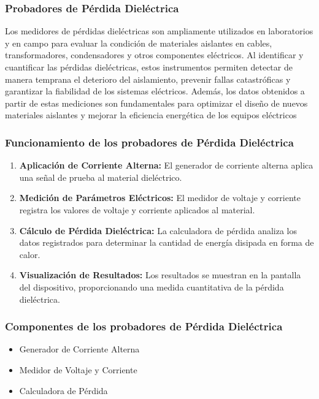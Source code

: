         \subsubsection{Probadores de Pérdida Dieléctrica}

            Los medidores de pérdidas dieléctricas son ampliamente utilizados en laboratorios y en campo para evaluar la condición de materiales aislantes en cables, transformadores, condensadores y otros componentes eléctricos. Al identificar y cuantificar las pérdidas dieléctricas, estos instrumentos permiten detectar de manera temprana el deterioro del aislamiento, prevenir fallas catastróficas y garantizar la fiabilidad de los sistemas eléctricos. Además, los datos obtenidos a partir de estas mediciones son fundamentales para optimizar el diseño de nuevos materiales aislantes y mejorar la eficiencia energética de los equipos eléctricos

        \subsubsection*{Funcionamiento de los probadores de Pérdida Dieléctrica}

            \begin{enumerate}
                \item \textbf{Aplicación de Corriente Alterna:} El generador de corriente alterna aplica una señal de prueba al material dieléctrico.
                \item \textbf{Medición de Parámetros Eléctricos:} El medidor de voltaje y corriente registra los valores de voltaje y corriente aplicados al material.
                \item \textbf{Cálculo de Pérdida Dieléctrica:} La calculadora de pérdida analiza los datos registrados para determinar la cantidad de energía disipada en forma de calor.
                \item \textbf{Visualización de Resultados:} Los resultados se muestran en la pantalla del dispositivo, proporcionando una medida cuantitativa de la pérdida dieléctrica.
            \end{enumerate}

        \subsubsection*{Componentes de los probadores de Pérdida Dieléctrica}

            \begin{itemize}
              \item Generador de Corriente Alterna
              \item Medidor de Voltaje y Corriente
              \item Calculadora de Pérdida
            \end{itemize}

